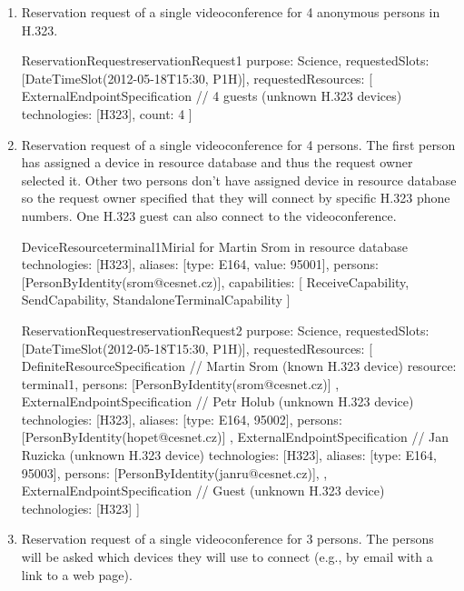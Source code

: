 \begin{enumerate}
\item Reservation request of a single videoconference for 4 anonymous persons in H.323.

\begin{EntityExample}{ReservationRequest}{reservationRequest1}{}
purpose: Science,
requestedSlots: [DateTimeSlot(2012-05-18T15:30, P1H)],
requestedResources: [
  ExternalEndpointSpecification { // 4 guests (unknown H.323 devices)
    technologies: [H323],
    count: 4
  }
]
\end{EntityExample}

\item Reservation request of a single videoconference for 4 persons. The first person  has assigned a device in resource database and thus the request owner selected it. Other two persons don't have assigned device in resource database so the request owner specified that they will connect by specific H.323 phone numbers. One H.323 guest can also connect to the videoconference.

\begin{EntityExample}{DeviceResource}{terminal1}{Mirial for Martin Srom in resource database}
technologies: [H323], 
aliases: [{type: E164, value: 95001}],
persons: [PersonByIdentity(srom@cesnet.cz)],
capabilities: [
  ReceiveCapability, SendCapability, StandaloneTerminalCapability
]
\end{EntityExample}

\begin{EntityExample}{ReservationRequest}{reservationRequest2}{}
purpose: Science,
requestedSlots: [DateTimeSlot(2012-05-18T15:30, P1H)],
requestedResources: [
  DefiniteResourceSpecification { // Martin Srom (known H.323 device)
    resource: terminal1,
    persons: [PersonByIdentity(srom@cesnet.cz)] 
  },
  ExternalEndpointSpecification { // Petr Holub (unknown H.323 device)
    technologies: [H323],
    aliases: [{type: E164, 95002}],
    persons: [PersonByIdentity(hopet@cesnet.cz)]
  },
  ExternalEndpointSpecification { // Jan Ruzicka (unknown H.323 device)
    technologies: [H323],
    aliases: [{type: E164, 95003}],
    persons: [PersonByIdentity(janru@cesnet.cz)], 
  },
  ExternalEndpointSpecification { // Guest (unknown H.323 device)
    technologies: [H323]
  }
]
\end{EntityExample}

\item Reservation request of a single videoconference for 3 persons. The persons will be asked which devices they will use to connect (e.g., by email with a link to a web page).


\end{enumerate}
